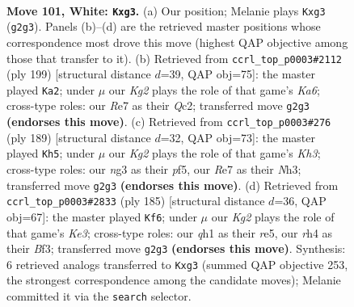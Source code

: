 \documentclass[11pt]{article}
\begin{document}
\clearpage

\begin{figure}[p]\centering
\begin{subfigure}{0.46\textwidth}\centering
\resizebox{\linewidth}{!}{%
\newchessgame
\chessboard[
  setfen={1k6/4R3/8/8/p6r/P5n1/6K1/7q w - - 0 101},
  showmover=false,
  pgfstyle=straightmove, color=movearrow, markmove={g2-g3}
]}
\caption{}
\end{subfigure}\hfill
\begin{subfigure}{0.46\textwidth}\centering
\resizebox{\linewidth}{!}{%
\newchessgame
\chessboard[
  setfen={8/8/8/1p6/1Q6/k2N1K2/2q5/8 b - - 14 100},
  showmover=false,
  pgfstyle=straightmove, color=movearrow, markmove={a3-a2}
]}
\caption{}
\end{subfigure}
\\[4pt]
\begin{subfigure}{0.46\textwidth}\centering
\resizebox{\linewidth}{!}{%
\newchessgame
\chessboard[
  setfen={8/1R4Q1/4P2k/5P2/P7/6Kn/8/8 b - - 0 95},
  showmover=false,
  pgfstyle=straightmove, color=movearrow, markmove={h6-h5}
]}
\caption{}
\end{subfigure}\hfill
\begin{subfigure}{0.46\textwidth}\centering
\resizebox{\linewidth}{!}{%
\newchessgame
\chessboard[
  setfen={8/P7/1N2k3/4R3/8/4Pb1p/3r4/6K1 b - - 1 93},
  showmover=false,
  pgfstyle=straightmove, color=movearrow, markmove={e6-f6}
]}
\caption{}
\end{subfigure}
\caption{\textbf{Move 101, White: \texttt{Kxg3}.} (a) Our position; Melanie plays \texttt{Kxg3} (\texttt{g2g3}). Panels (b)--(d) are the retrieved master positions whose correspondence most drove this move (highest QAP objective among those that transfer to it). (b) Retrieved from \texttt{ccrl\_top\_p0003\#2112} (ply 199) [structural distance $d$=39, QAP obj=75]: the master played \texttt{Ka2}; under $\mu$ our \emph{Kg2} plays the role of that game's \emph{Ka6}; cross-type roles: our \emph{R}e7 as their \emph{Q}c2; transferred move \texttt{g2g3} \textbf{(endorses this move)}. (c) Retrieved from \texttt{ccrl\_top\_p0003\#276} (ply 189) [structural distance $d$=32, QAP obj=73]: the master played \texttt{Kh5}; under $\mu$ our \emph{Kg2} plays the role of that game's \emph{Kh3}; cross-type roles: our \emph{n}g3 as their \emph{p}f5, our \emph{R}e7 as their \emph{N}h3; transferred move \texttt{g2g3} \textbf{(endorses this move)}. (d) Retrieved from \texttt{ccrl\_top\_p0003\#2833} (ply 185) [structural distance $d$=36, QAP obj=67]: the master played \texttt{Kf6}; under $\mu$ our \emph{Kg2} plays the role of that game's \emph{Ke3}; cross-type roles: our \emph{q}h1 as their \emph{r}e5, our \emph{r}h4 as their \emph{B}f3; transferred move \texttt{g2g3} \textbf{(endorses this move)}. Synthesis: 6 retrieved analogs transferred to \texttt{Kxg3} (summed QAP objective 253, the strongest correspondence among the candidate moves); Melanie committed it via the \texttt{search} selector.}
\label{fig:thought-m200}
\end{figure}
\end{document}
